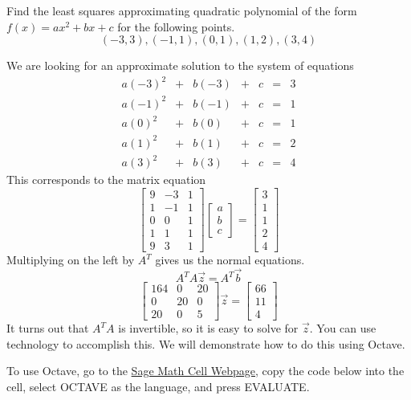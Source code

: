 \documentclass{ximera}
\begin{document}
 \begin{example}\label{ex:leastSquaresPoly}
Find the least squares approximating quadratic polynomial of the form $f(x)=ax^2+bx+c$ for the following points.
$$(-3, 3), (-1, 1), (0, 1), (1, 2), (3, 4)$$

\begin{explanation}
    We are looking for an approximate solution to the system of equations
    $$\begin{matrix}a(-3)^2&+&b(-3)&+&c&=&3\\a(-1)^2&+&b(-1)&+&c&=&1\\a(0)^2&+&b(0)&+&c&=&1\\a(1)^2&+&b(1)&+&c&=&2\\a(3)^2&+&b(3)&+&c&=&4\end{matrix}$$
    This corresponds to the matrix equation
    $$\begin{bmatrix}9&-3&1\\1&-1&1\\0&0&1\\1&1&1\\9&3&1\end{bmatrix}\begin{bmatrix}a\\b\\c\end{bmatrix}=\begin{bmatrix}3\\1\\1\\2\\4\end{bmatrix}$$
    Multiplying on the left by $A^T$ gives us the normal equations.
    $$A^TA\vec{z}=A^T\vec{b}$$
    $$\begin{bmatrix}164&0&20\\0&20&0\\20&0&5\end{bmatrix}\vec{z}=\begin{bmatrix}66\\11\\4\end{bmatrix}$$
    It turns out that $A^TA$ is invertible, so it is easy to solve for $\vec{z}$.  You can use technology to accomplish this.  We will demonstrate how to do this using Octave.  

To use Octave, go to the \href{https://sagecell.sagemath.org/}{Sage Math Cell Webpage}, copy the code below into the cell, select OCTAVE as the language, and press EVALUATE.


\end{explanation}
\end{example}
\end{document}
